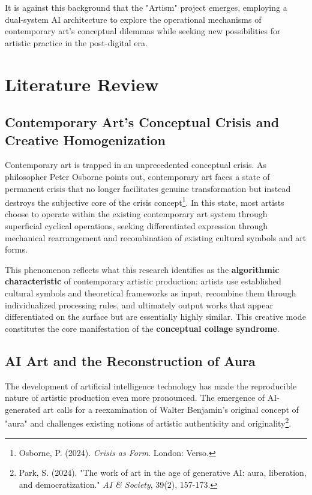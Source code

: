 \documentclass{article}
\begin{document}
It is against this background that the "Artism" project emerges, employing a dual-system AI architecture to explore the operational mechanisms of contemporary art's conceptual dilemmas while seeking new possibilities for artistic practice in the post-digital era.

\section{Literature Review}

\subsection{Contemporary Art's Conceptual Crisis and Creative Homogenization}

Contemporary art is trapped in an unprecedented conceptual crisis. As philosopher Peter Osborne points out, contemporary art faces a state of permanent crisis that no longer facilitates genuine transformation but instead destroys the subjective core of the crisis concept\footnote{Osborne, P. (2024). \textit{Crisis as Form}. London: Verso.}. In this state, most artists choose to operate within the existing contemporary art system through superficial cyclical operations, seeking differentiated expression through mechanical rearrangement and recombination of existing cultural symbols and art forms.

This phenomenon reflects what this research identifies as the \textbf{algorithmic characteristic} of contemporary artistic production: artists use established cultural symbols and theoretical frameworks as input, recombine them through individualized processing rules, and ultimately output works that appear differentiated on the surface but are essentially highly similar. This creative mode constitutes the core manifestation of the \textbf{conceptual collage syndrome}.

\subsection{AI Art and the Reconstruction of Aura}

The development of artificial intelligence technology has made the reproducible nature of artistic production even more pronounced. The emergence of AI-generated art calls for a reexamination of Walter Benjamin's original concept of "aura" and challenges existing notions of artistic authenticity and originality\footnote{Park, S. (2024). "The work of art in the age of generative AI: aura, liberation, and democratization." \textit{AI \& Society}, 39(2), 157-173.}. 
\end{document}
